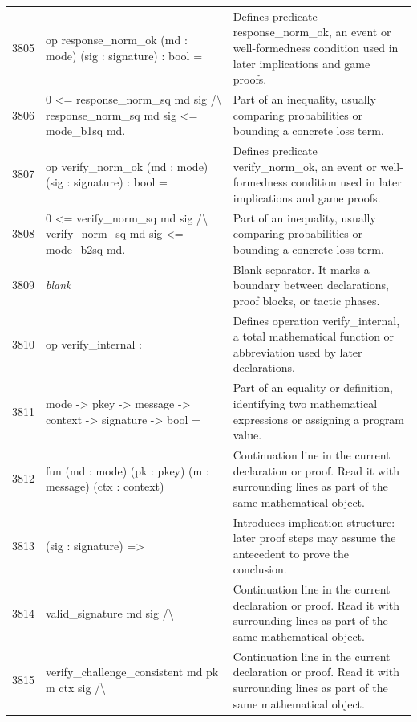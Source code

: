 \documentclass[10pt]{article}
\begin{document}
\begin{longtable}{r L{0.53\textwidth} L{0.37\textwidth}}
3805 & {\ttfamily\scriptsize op response\_norm\_ok (md : mode) (sig : signature) : bool =} & Defines predicate response\_norm\_ok, an event or well-formedness condition used in later implications and game proofs. \\
3806 & {\ttfamily\scriptsize   0 <= response\_norm\_sq md sig /\textbackslash{} response\_norm\_sq md sig <= mode\_b1sq md.} & Part of an inequality, usually comparing probabilities or bounding a concrete loss term. \\
3807 & {\ttfamily\scriptsize op verify\_norm\_ok (md : mode) (sig : signature) : bool =} & Defines predicate verify\_norm\_ok, an event or well-formedness condition used in later implications and game proofs. \\
3808 & {\ttfamily\scriptsize   0 <= verify\_norm\_sq md sig /\textbackslash{} verify\_norm\_sq md sig <= mode\_b2sq md.} & Part of an inequality, usually comparing probabilities or bounding a concrete loss term. \\
3809 & {\ttfamily\scriptsize \emph{blank}} & Blank separator.  It marks a boundary between declarations, proof blocks, or tactic phases. \\
3810 & {\ttfamily\scriptsize op verify\_internal :} & Defines operation verify\_internal, a total mathematical function or abbreviation used by later declarations. \\
3811 & {\ttfamily\scriptsize   mode -> pkey -> message -> context -> signature -> bool =} & Part of an equality or definition, identifying two mathematical expressions or assigning a program value. \\
3812 & {\ttfamily\scriptsize   fun (md : mode) (pk : pkey) (m : message) (ctx : context)} & Continuation line in the current declaration or proof.  Read it with surrounding lines as part of the same mathematical object. \\
3813 & {\ttfamily\scriptsize       (sig : signature) =>} & Introduces implication structure: later proof steps may assume the antecedent to prove the conclusion. \\
3814 & {\ttfamily\scriptsize     valid\_signature md sig /\textbackslash{}} & Continuation line in the current declaration or proof.  Read it with surrounding lines as part of the same mathematical object. \\
3815 & {\ttfamily\scriptsize     verify\_challenge\_consistent md pk m ctx sig /\textbackslash{}} & Continuation line in the current declaration or proof.  Read it with surrounding lines as part of the same mathematical object. \\

\end{longtable}
\end{document}

